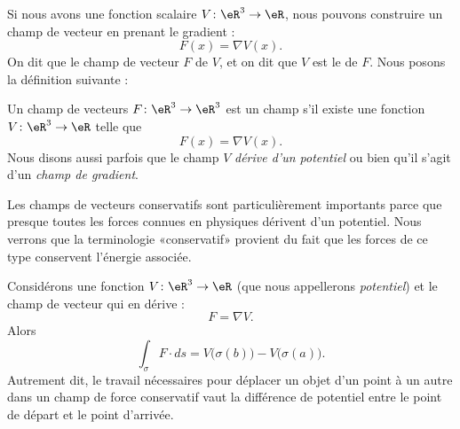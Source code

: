 Si nous avons une fonction scalaire $V\colon \eR^3\to \eR$, nous pouvons construire un champ de vecteur en prenant le gradient :
\begin{equation}
    F(x)=\nabla V(x).
\end{equation}
On dit que le champ de vecteur $F$  de $V$, et on dit que $V$ est le  de $F$. Nous posons la définition suivante :
\begin{definition}
    Un champ de vecteurs $F\colon \eR^3\to \eR^3$ est un champ  s'il existe une fonction $V\colon \eR^3\to \eR$ telle que
    \begin{equation}
        F(x)=\nabla V(x).
    \end{equation}
    Nous disons aussi parfois que le champ $V$ \emph{dérive d'un potentiel} ou bien qu'il s'agit d'un \emph{champ de gradient}.
\end{definition}

Les champs de vecteurs conservatifs sont particulièrement importants parce que presque toutes les forces connues en physiques dérivent d'un potentiel. Nous verrons que la terminologie «conservatif» provient du fait que les forces de ce type conservent l'énergie associée.


\begin{proposition}
    Considérons une fonction $V\colon \eR^3\to \eR$ (que nous appellerons \emph{potentiel}) et le champ de vecteur qui en dérive :
    \begin{equation}
        F=\nabla V.
    \end{equation}
    Alors 
    \begin{equation}
        \int_{\sigma}F\cdot ds=V\big( \sigma(b) \big)-V\big( \sigma(a) \big).
    \end{equation}
    Autrement dit, le travail nécessaires pour déplacer un objet d'un point à un autre dans un champ de force conservatif vaut la différence de potentiel entre le point de départ et le point d'arrivée.
\end{proposition}

